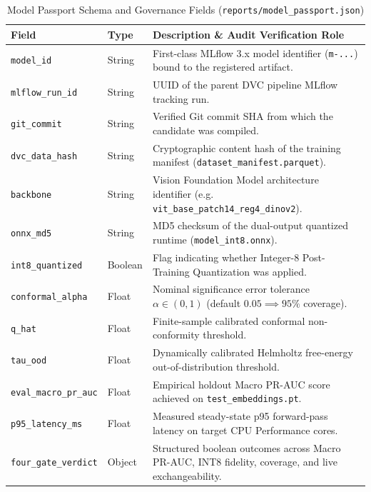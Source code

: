 \begin{table}[htbp]
\centering
\small
\caption{Model Passport Schema and Governance Fields (\nolinkurl{reports/model_passport.json})}
\label{tab:model_passport}
\begin{tabularx}{\textwidth}{@{}l l X@{}}
\toprule
\textbf{Field} & \textbf{Type} & \textbf{Description \& Audit Verification Role} \\
\midrule
\texttt{model\_id} & String & First-class MLflow 3.x model identifier (\texttt{m-...}) bound to the registered artifact. \\
\texttt{mlflow\_run\_id} & String & UUID of the parent DVC pipeline MLflow tracking run. \\
\texttt{git\_commit} & String & Verified Git commit SHA from which the candidate was compiled. \\
\texttt{dvc\_data\_hash} & String & Cryptographic content hash of the training manifest (\texttt{dataset\_manifest.parquet}). \\
\texttt{backbone} & String & Vision Foundation Model architecture identifier (e.g. \texttt{vit\_base\_patch14\_reg4\_dinov2}). \\
\texttt{onnx\_md5} & String & MD5 checksum of the dual-output quantized runtime (\nolinkurl{model_int8.onnx}). \\
\texttt{int8\_quantized} & Boolean & Flag indicating whether Integer-8 Post-Training Quantization was applied. \\
\texttt{conformal\_alpha} & Float & Nominal significance error tolerance $\alpha \in (0, 1)$ (default $0.05 \implies 95\%$ coverage). \\
\texttt{q\_hat} & Float & Finite-sample calibrated conformal non-conformity threshold. \\
\texttt{tau\_ood} & Float & Dynamically calibrated Helmholtz free-energy out-of-distribution threshold. \\
\texttt{eval\_macro\_pr\_auc} & Float & Empirical holdout Macro PR-AUC score achieved on \nolinkurl{test_embeddings.pt}. \\
\texttt{p95\_latency\_ms} & Float & Measured steady-state p95 forward-pass latency on target CPU Performance cores. \\
\texttt{four\_gate\_verdict} & Object & Structured boolean outcomes across Macro PR-AUC, INT8 fidelity, coverage, and live exchangeability. \\
\bottomrule
\end{tabularx}
\end{table}

